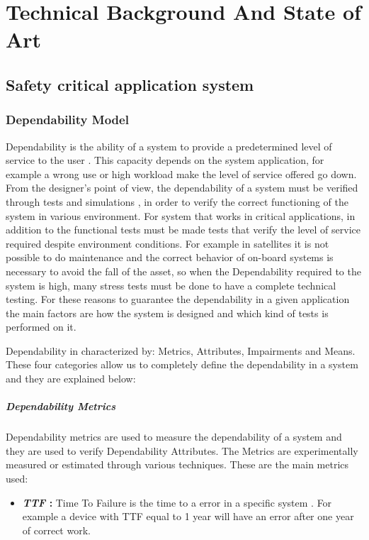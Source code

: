 \chapter{Technical Background And State of Art}{
	
	\section*{Safety critical application system}{
		
		\subsection{Dependability Model}{
			Dependability is the ability of a system to provide a predetermined level of service to the user \cite{Dubrova2013}. This capacity depends on the system application, for example a wrong use or high workload make the level of service offered go down. From the designer's point of view, the dependability of a system must be verified through tests and simulations , in order to verify the correct functioning of the system in various environment. For system that works in critical applications, in addition to the functional tests must be made tests that verify the level of service required despite environment conditions. For example in satellites it is not possible to do maintenance and the correct behavior of on-board systems is necessary to avoid the fall of the asset, so when the Dependability required to the system is high, many stress tests must be done to have a complete technical testing. For these reasons to guarantee the dependability in a given application the main factors are how the system is designed and which kind of tests is performed on it.
			
			Dependability in characterized by: Metrics, Attributes, Impairments and Means. These four categories allow us to completely define the dependability in a system and they are explained below:
			\paragraph{Dependability Metrics}{
				Dependability metrics are used to measure the dependability of a system and they are used to verify Dependability Attributes. The Metrics are experimentally measured or estimated through various techniques. These are the main metrics used: 
				\begin{itemize}
					\item \textbf{\textit{TTF} : } Time To Failure is the time to a error in a specific system \cite{Mukherjee2008}. For example a device with TTF equal to 1 year will have an error after one year of correct work.
		

\end{itemize}}}}}
